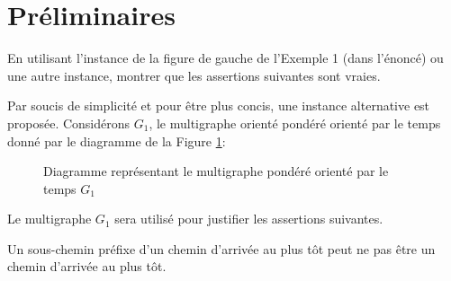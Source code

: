 
\section{Préliminaires}
\label{sec:preliminaires}

\begin{question}
  En utilisant l'instance de la figure de gauche de l'Exemple 1 (dans l'énoncé)
  ou une autre instance, montrer que les assertions suivantes sont vraies.
\end{question}

Par soucis de simplicité et pour être plus concis, une instance alternative est
proposée. Considérons $G_{1}$, le multigraphe orienté pondéré orienté par le
temps donné par le diagramme de la Figure \ref{fig:G1}:

\begin{figure}[h!]
  \centering
  \caption{Diagramme représentant le multigraphe pondéré orienté par le temps $G_{1}$}
  \label{fig:G1}
\end{figure}

Le multigraphe $G_1$ sera utilisé pour justifier les assertions suivantes.

\begin{assertion}
  Un sous-chemin préfixe d'un chemin d'arrivée au plus tôt peut ne pas
  être un chemin d'arrivée au plus tôt.
\end{assertion}



